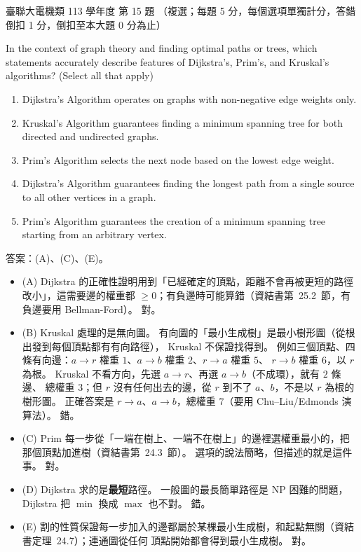 \begin{pastexam}[label={px:ust-113-ee-ds-15}]{臺聯大電機類 113 學年度 第 15 題}
（複選；每題 5 分，每個選項單獨計分，答錯倒扣 1 分，倒扣至本大題 0 分為止）

In the context of graph theory and finding optimal paths or trees, which statements accurately
describe features of Dijkstra's, Prim's, and Kruskal's algorithms? (Select all that apply)
\begin{enumerate}[label=(\Alph*)]
\item Dijkstra's Algorithm operates on graphs with non-negative edge weights only.
\item Kruskal's Algorithm guarantees finding a minimum spanning tree for both directed and
undirected graphs.
\item Prim's Algorithm selects the next node based on the lowest edge weight.
\item Dijkstra's Algorithm guarantees finding the longest path from a single source to all other
vertices in a graph.
\item Prim's Algorithm guarantees the creation of a minimum spanning tree starting from an
arbitrary vertex.
\end{enumerate}
\end{pastexam}

\begin{pastsoln}
答案：(A)、(C)、(E)。

\begin{itemize}
\item (A) Dijkstra 的正確性證明用到「已經確定的頂點，距離不會再被更短的路徑改小」，這需要邊的權重都
$\ge 0$；有負邊時可能算錯（資結書第~25.2~節，有負邊要用 Bellman-Ford）。 對。
\item (B) Kruskal 處理的是無向圖。 有向圖的「最小生成樹」是最小樹形圖（從根出發到每個頂點都有有向路徑），
Kruskal 不保證找得到。 例如三個頂點、四條有向邊：$a \to r$ 權重 $1$、$a \to b$ 權重 $2$、$r \to a$ 權重 $5$、
$r \to b$ 權重 $6$，以 $r$ 為根。 Kruskal 不看方向，先選 $a \to r$、再選 $a \to b$（不成環），就有 $2$ 條邊、
總權重 $3$；但 $r$ 沒有任何出去的邊，從 $r$ 到不了 $a$、$b$，不是以 $r$ 為根的樹形圖。 正確答案是
$r \to a$、$a \to b$，總權重 $7$（要用 Chu–Liu/Edmonds 演算法）。 錯。
\item (C) Prim 每一步從「一端在樹上、一端不在樹上」的邊裡選權重最小的，把那個頂點加進樹（資結書第~24.3~節）。
選項的說法簡略，但描述的就是這件事。 對。
\item (D) Dijkstra 求的是\textbf{最短}路徑。 一般圖的最長簡單路徑是 NP 困難的問題，Dijkstra 把 $\min$ 換成
$\max$ 也不對。 錯。
\item (E) 割的性質保證每一步加入的邊都屬於某棵最小生成樹，和起點無關（資結書定理~24.7）；連通圖從任何
頂點開始都會得到最小生成樹。 對。
\end{itemize}
\end{pastsoln}
